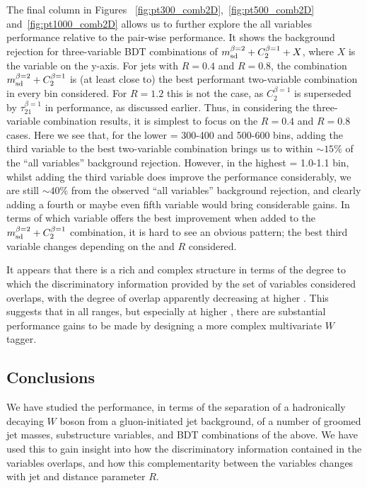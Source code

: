The final column in Figures ~\ref{fig:pt300_comb2D},~\ref{fig:pt500_comb2D}
and~\ref{fig:pt1000_comb2D} allows us to further explore the all variables
performance relative to the pair-wise performance. It shows the background rejection for 
three-variable BDT combinations of $m_{\rm sd}^{\beta=2} + C_2^{\beta=1} +
X$, where $X$ is the variable on the y-axis. For jets with $R=0.4$ and
$R=0.8$, the combination $m_{\rm sd}^{\beta=2} + C_2^{\beta=1}$
is (at least close to) the best performant
two-variable combination in every \pt bin considered. For $R=1.2$ this
is not the case, as $C_2^{\beta=1}$ is superseded by
$\tau_{21}^{\beta=1}$ in performance, as discussed earlier. Thus, in
considering the three-variable combination results, it is simplest to focus
on the $R=0.4$ and $R=0.8$ cases. Here we see that, for the lower \pt =
300-400 and 500-600 \GeV bins, adding the third variable to the best
two-variable combination brings us to within $\sim 15\%$ of the ``all
variables'' background rejection. However, in the highest \pt = 1.0-1.1 \TeV bin, whilst adding the third
variable does improve the performance considerably, we are still $\sim
40\%$ from the observed ``all variables'' background rejection, and
clearly adding a fourth or maybe even fifth variable would bring
considerable gains. In terms of which variable offers the best
improvement when added to the $m_{\rm sd}^{\beta=2} + C_2^{\beta=1}$
combination, it is hard to see an obvious pattern; the best third
variable changes depending on the \pt and $R$ considered.

It appears that there is a rich and
complex structure in terms of the degree to which the discriminatory
information provided by the set of variables considered overlaps, with
the degree of overlap apparently decreasing at higher \pt. This
suggests that in all \pt ranges, but especially at higher \pt, there
are substantial performance gains to be made by designing a more
complex multivariate $W$ tagger.

\subsection{Conclusions}

We have studied the performance, in terms of the separation of a
hadronically decaying $W$ boson from a gluon-initiated jet
background, of a number of groomed jet masses, substructure variables,
and BDT combinations of the above. We have used this to gain insight into
 how the discriminatory information contained in the
variables overlaps, and how this complementarity between the variables
changes with jet \pt and \antikt distance parameter $R$. 

